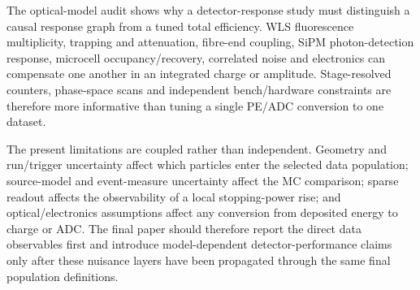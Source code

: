 The optical-model audit shows why a detector-response study must distinguish a causal response graph from a tuned total efficiency. WLS fluorescence multiplicity, trapping and attenuation, fibre-end coupling, SiPM photon-detection response, microcell occupancy/recovery, correlated noise and electronics can compensate one another in an integrated charge or amplitude. Stage-resolved counters, phase-space scans and independent bench/hardware constraints are therefore more informative than tuning a single PE/ADC conversion to one dataset.

The present limitations are coupled rather than independent. Geometry and run/trigger uncertainty affect which particles enter the selected data population; source-model and event-measure uncertainty affect the MC comparison; sparse readout affects the observability of a local stopping-power rise; and optical/electronics assumptions affect any conversion from deposited energy to charge or ADC. The final paper should therefore report the direct data observables first and introduce model-dependent detector-performance claims only after these nuisance layers have been propagated through the same final population definitions.
